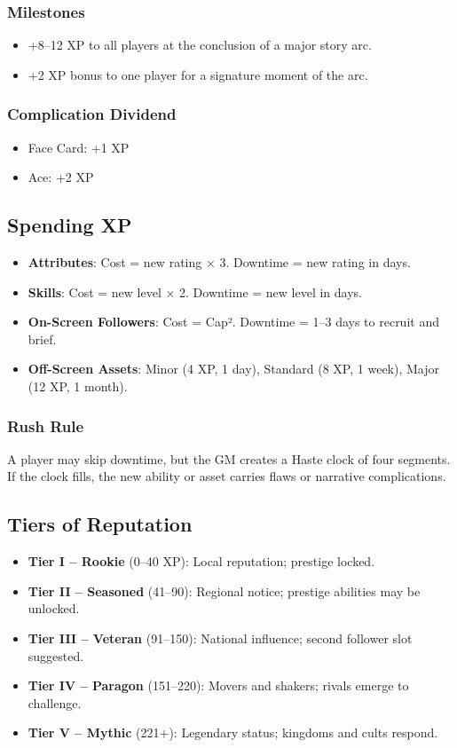 \documentclass[11pt]{article}
\begin{document}
\subsubsection{Milestones}
\begin{itemize}
    \item +8–12 XP to all players at the conclusion of a major story arc.
    \item +2 XP bonus to one player for a signature moment of the arc.
\end{itemize}

\subsubsection{Complication Dividend}
\begin{itemize}
    \item Face Card: +1 XP
    \item Ace: +2 XP
\end{itemize}

\subsection{Spending XP}
\begin{itemize}
    \item \textbf{Attributes}: Cost = new rating × 3. Downtime = new rating in days.
    \item \textbf{Skills}: Cost = new level × 2. Downtime = new level in days.
    \item \textbf{On-Screen Followers}: Cost = Cap². Downtime = 1–3 days to recruit and brief.
    \item \textbf{Off-Screen Assets}: Minor (4 XP, 1 day), Standard (8 XP, 1 week), Major (12 XP, 1 month).
\end{itemize}

\subsubsection{Rush Rule}
A player may skip downtime, but the GM creates a Haste clock of four segments. If the clock fills, the new ability or asset carries flaws or narrative complications.

\subsection{Tiers of Reputation}
\begin{itemize}
    \item \textbf{Tier I – Rookie} (0–40 XP): Local reputation; prestige locked.
    \item \textbf{Tier II – Seasoned} (41–90): Regional notice; prestige abilities may be unlocked.
    \item \textbf{Tier III – Veteran} (91–150): National influence; second follower slot suggested.
    \item \textbf{Tier IV – Paragon} (151–220): Movers and shakers; rivals emerge to challenge.
    \item \textbf{Tier V – Mythic} (221+): Legendary status; kingdoms and cults respond.
\end{itemize}
\end{document}
